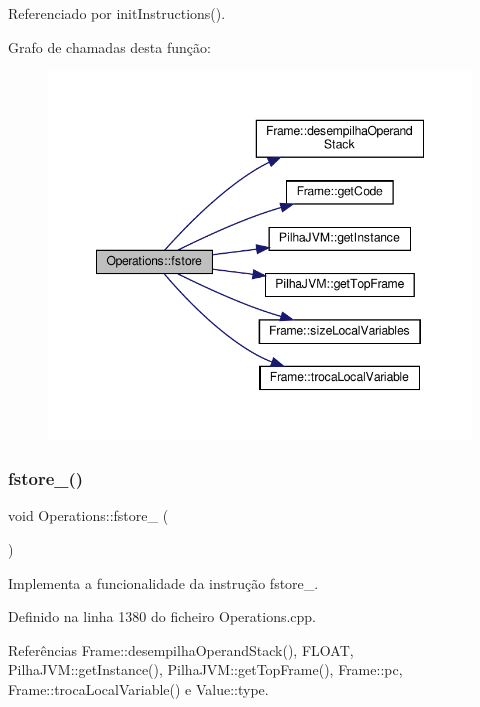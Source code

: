 Referenciado por init\+Instructions().

Grafo de chamadas desta função\+:
\nopagebreak
\begin{figure}[H]
\begin{center}
\leavevmode
\includegraphics[width=348pt]{classOperations_a42a0b3220b593059320cf7d5a5eed6e2_cgraph}
\end{center}
\end{figure}
\mbox{\label{classOperations_a7465534bbf4e4ca9f0493a8dbe645d46}} 
\subsubsection{\texorpdfstring{fstore\+\_()}{fstore\_0()}}
{\footnotesize\ttfamily void Operations\+::fstore\+\_ (\begin{DoxyParamCaption}{ }\end{DoxyParamCaption})\hspace{0.3cm}{\ttfamily [private]}}



Implementa a funcionalidade da instrução fstore\+\_. 



Definido na linha 1380 do ficheiro Operations.\+cpp.



Referências Frame\+::desempilha\+Operand\+Stack(), F\+L\+O\+AT, Pilha\+J\+V\+M\+::get\+Instance(), Pilha\+J\+V\+M\+::get\+Top\+Frame(), Frame\+::pc, Frame\+::troca\+Local\+Variable() e Value\+::type.



